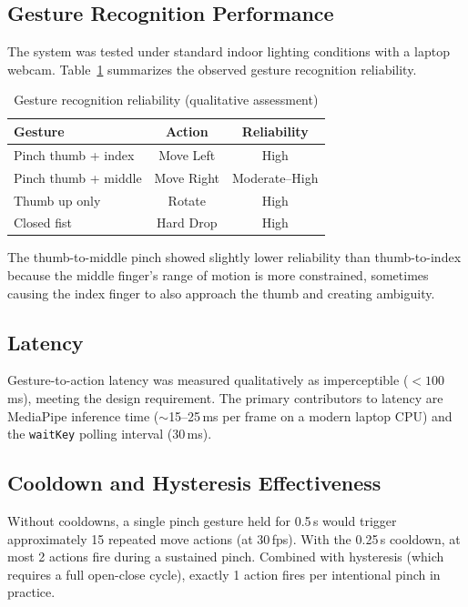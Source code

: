 \documentclass[conference]{IEEEtran}
\begin{document}
\subsection{Gesture Recognition Performance}

The system was tested under standard indoor lighting conditions with a laptop webcam. Table~\ref{tab:gesture_results} summarizes the observed gesture recognition reliability.

\begin{table}[H]
\centering
\caption{Gesture recognition reliability (qualitative assessment)}
\label{tab:gesture_results}
\begin{tabular}{|l|c|c|}
\hline
\textbf{Gesture} & \textbf{Action} & \textbf{Reliability} \\
\hline
Pinch thumb + index & Move Left & High \\
Pinch thumb + middle & Move Right & Moderate--High \\
Thumb up only & Rotate & High \\
Closed fist & Hard Drop & High \\
\hline
\end{tabular}
\end{table}

The thumb-to-middle pinch showed slightly lower reliability than thumb-to-index because the middle finger's range of motion is more constrained, sometimes causing the index finger to also approach the thumb and creating ambiguity.

\subsection{Latency}

Gesture-to-action latency was measured qualitatively as imperceptible ($< 100$\,ms), meeting the design requirement. The primary contributors to latency are MediaPipe inference time ($\sim$15--25\,ms per frame on a modern laptop CPU) and the \texttt{waitKey} polling interval (30\,ms).

\subsection{Cooldown and Hysteresis Effectiveness}

Without cooldowns, a single pinch gesture held for 0.5\,s would trigger approximately 15 repeated move actions (at 30\,fps). With the 0.25\,s cooldown, at most 2 actions fire during a sustained pinch. Combined with hysteresis (which requires a full open-close cycle), exactly 1 action fires per intentional pinch in practice.
\end{document}
